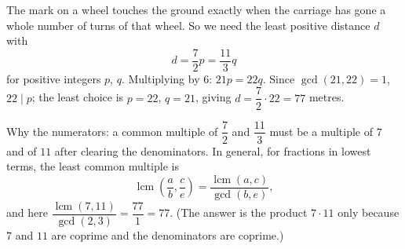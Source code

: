 The mark on a wheel touches the ground exactly when the carriage has gone a whole number of turns of that wheel. So we need the least positive distance $d$ with
\[
d=\dfrac{7}{2}p=\dfrac{11}{3}q
\]
for positive integers $p$, $q$. Multiplying by $6$: $21p=22q$. Since $\gcd(21,22)=1$, $22\mid p$; the least choice is $p=22$, $q=21$, giving $d=\dfrac{7}{2}\cdot22=\boxed{77}$ metres.

Why the numerators: a common multiple of $\dfrac{7}{2}$ and $\dfrac{11}{3}$ must be a multiple of $7$ and of $11$ after clearing the denominators. In general, for fractions in lowest terms, the least common multiple is
\[
\operatorname{lcm}\left(\dfrac{a}{b},\dfrac{c}{e}\right)=\dfrac{\operatorname{lcm}(a,c)}{\gcd(b,e)},
\]
and here $\dfrac{\operatorname{lcm}(7,11)}{\gcd(2,3)}=\dfrac{77}{1}=77$. (The answer is the product $7\cdot11$ only because $7$ and $11$ are coprime and the denominators are coprime.)

